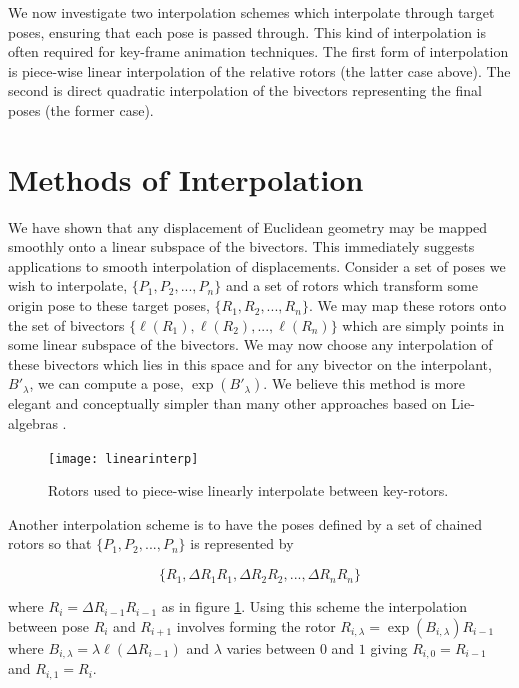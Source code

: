 We now investigate two interpolation schemes which interpolate through target
poses, ensuring that each pose is passed through. This kind of interpolation is
often required for key-frame animation techniques. The first form of
interpolation is piece-wise linear interpolation of the relative rotors (the
		latter case above). The second is direct quadratic
interpolation of the bivectors representing the final poses (the former case).

\section{Methods of Interpolation}


We have shown that any displacement of Euclidean geometry
may be mapped smoothly
onto a linear subspace of the bivectors. This immediately suggests applications to smooth interpolation
of displacements. Consider a set of poses we wish to interpolate, $\{P_1, P_2, ..., P_n\}$ and a set
of rotors which transform some origin pose to these target poses, $\{R_1, R_2, ..., R_n\}$. We
may map these rotors onto the set of bivectors $\{\ell(R_1), \ell(R_2), ..., \ell(R_n)\}$ which
are simply points in some linear subspace of the bivectors. We may now choose any interpolation of these bivectors
which lies in this space and for any bivector on the interpolant, $B'_\lambda$, we can compute
a pose, $\exp(B'_\lambda)$. We believe this method is more elegant and conceptually simpler
than many other approaches based on Lie-algebras \cite{LIE:Consistentmotion, LIE:Moak,
  LIE:ROT, LIE:Sphericalfun}.

\begin{figure}[t]\centering
\texttt{[image: linearinterp]}
\caption{\label{fig:linearinterp}Rotors used to piece-wise linearly interpolate between key-rotors.}
\end{figure}

Another interpolation scheme is to have the poses defined by a set of chained rotors so that
$\{P_1, P_2, ..., P_n\}$ is represented by 

\[\{R_1, \Delta R_1R_1, \Delta R_2 R_2, ..., \Delta R_n R_n\}\]

where $R_i = \Delta R_{i-1} R_{i-1}$ as in figure \ref{fig:linearinterp}. Using
this scheme the interpolation between pose $R_i$ and $R_{i+1}$ involves forming
the rotor $R_{i,\lambda} = \exp(B_{i,\lambda})R_{i-1}$ where $B_{i,\lambda} =
\lambda \ell(\Delta R_{i-1})$ and $\lambda$ varies between $0$ and $1$ giving
$R_{i,0} = R_{i-1}$ and $R_{i,1} = R_i$.


